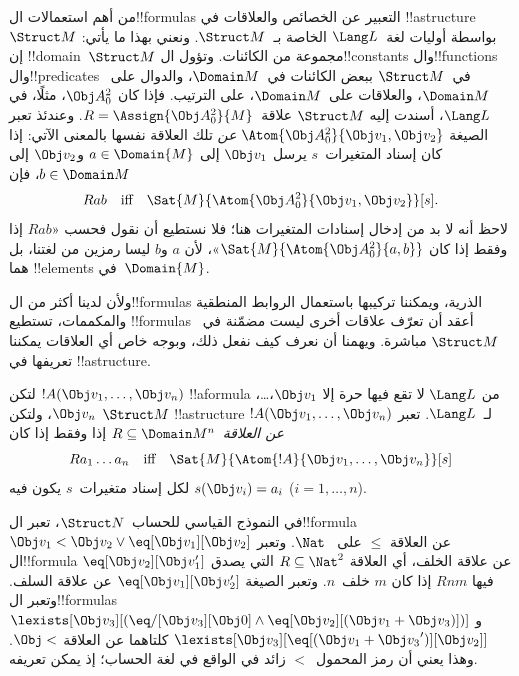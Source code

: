 \documentclass[../../../include/open-logic-section]{subfiles}
\begin{document}


\begin{explain}
من أهم استعمالات ال!!{formula}s التعبير عن الخصائص والعلاقات في
!!a{structure}~$\Struct M$ بواسطة أوليات لغة~$\Lang L$ الخاصة
بـ~$\Struct M$. ونعني بهذا ما يأتي: إن !!{domain}~$\Struct M$ مجموعة
من الكائنات. وتؤول ال!!{constant}s وال!!{function}s وال!!{predicate}s
في~$\Struct M$ ببعض الكائنات في~$\Domain M$، والدوال على~$\Domain M$،
والعلاقات على~$\Domain M$، على الترتيب. فإذا كان $\Obj A^2_0$، مثلًا،
في $\Lang L$، أسندت إليه $\Struct M$ علاقة~$R = \Assign{{\Obj
  A^2_0}}{M}$. وعندئذ تعبر الصيغة $\Atom{\Obj A^2_0}{\Obj v_1, \Obj v_2}$
\emph{عن} تلك العلاقة نفسها بالمعنى الآتي: إذا كان إسناد
المتغيرات~$s$ يرسل $\Obj v_1$ إلى $a \in \Domain{M}$ و$\Obj v_2$ إلى
$b \in \Domain M$، فإن
\[
Rab \text{\quad iff\quad} \Sat{M}{\Atom{\Obj A^2_0}{\Obj v_1, \Obj v_2}}[s].
\]
لاحظ أنه لا بد من إدخال إسنادات المتغيرات هنا؛ فلا نستطيع أن نقول
فحسب «$Rab$ إذا وفقط إذا كان $\Sat{M}{\Atom{\Obj A^2_0}{a, b}}$»،
لأن $a$ و$b$ ليسا رمزين من لغتنا، بل هما !!{element}s
في~$\Domain{M}$.

ولأن لدينا أكثر من ال!!{formula}s الذرية، ويمكننا تركيبها باستعمال
الروابط المنطقية والمكممات، تستطيع !!{formula}s أعقد أن تعرّف علاقات
أخرى ليست مضمّنة في~$\Struct M$ مباشرة. ويهمنا أن نعرف كيف نفعل ذلك،
وبوجه خاص أي العلاقات يمكننا تعريفها في !!a{structure}.
\end{explain}

\begin{defn}
لتكن $!A(\Obj v_1,\dots, \Obj v_n)$ !!a{formula} من $\Lang L$ لا
تقع فيها حرة إلا $\Obj v_1$،\dots، $\Obj v_n$، ولتكن $\Struct M$
!!a{structure} لـ~$\Lang L$. تعبر $!A(\Obj v_1,\dots, \Obj v_n)$
\emph{عن العلاقة}~$R \subseteq \Domain M^n$ إذا وفقط إذا كان
\[
Ra_1\dots a_n \text{\quad iff\quad} \Sat{M}{\Atom{!A}{\Obj
    v_1,\dots, \Obj v_n}}[s]
\]
لكل إسناد متغيرات~$s$ يكون فيه $s(\Obj v_i) = a_i$ ($i = 1,
\dots, n$).
\end{defn}

\begin{ex}
في النموذج القياسي للحساب~$\Struct N$، تعبر ال!!{formula} $\Obj
v_1 < \Obj v_2 \lor \eq[\Obj v_1][\Obj v_2]$ عن العلاقة $\le$ على
~$\Nat$. وتعبر ال!!{formula} $\eq[\Obj v_2][\Obj v_1']$ عن علاقة
الخلف، أي العلاقة $R \subseteq \Nat^2$ التي يصدق فيها $Rnm$ إذا كان
$m$ خلف~$n$. وتعبر الصيغة $\eq[\Obj v_1][\Obj v_2']$ عن علاقة السلف.
وتعبر ال!!{formula}s $\lexists[\Obj v_3][(\eq/[\Obj v_3][\Obj 0] \land
  \eq[\Obj v_2][(\Obj v_1 + \Obj v_3)])]$ و$\lexists[\Obj
  v_3][\eq[(\Obj v_1 + {\Obj v_3}')][\Obj v_2]]$ كلتاهما عن العلاقة
$\Obj <$. وهذا يعني أن رمز المحمول~$<$ زائد في الواقع في لغة الحساب؛
إذ يمكن تعريفه.
\end{ex}
\end{document}
